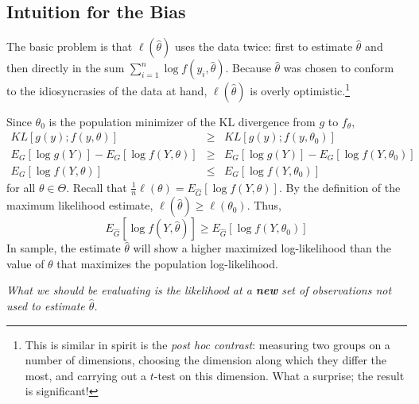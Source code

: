 \documentclass[12pt]{article}
\theoremstyle{definition}
\begin{document}
\subsection{Intuition for the Bias}
The basic problem is that $\ell(\hat{\theta})$ uses the data twice: first to estimate $\hat{\theta}$ and then directly in the sum $\sum_{i=1}^n \log{ f(y_i,\hat{\theta})}$. Because $\hat{\theta}$ was chosen to conform to the idiosyncrasies of the data at hand, $\ell(\hat{\theta})$ is overly optimistic.\footnote{This is similar in spirit is the \emph{post hoc contrast}: measuring two groups on a number of dimensions, choosing the dimension along which they differ the most, and carrying out a $t$-test on this dimension. What a surprise; the result is significant!}

Since $\theta_0$ is the population minimizer of the KL divergence from $g$ to $f_\theta$, 
	\begin{eqnarray*}
		KL\left[ g(y);f(y,\theta) \right] &\geq& KL\left[ g(y);f(y,\theta_0) \right]\\
		E_G\left[  \log{g(Y)}\right] - E_G\left[ \log{f(Y,\theta)} \right] &\geq& E_G\left[  \log{g(Y)}\right] - E_G\left[ \log{f(Y,\theta_0)} \right]\\
	  E_G\left[ \log{f(Y,\theta)} \right] &\leq&  E_G\left[ \log{f(Y,\theta_0)} \right]\
	\end{eqnarray*}
for all $\theta \in \Theta$. Recall that $\frac{1}{n}\ell(\theta) = E_{\hat{G}}\left[ \log{f(Y,\theta)}\right]$. By the definition of the maximum likelihood estimate, $\ell(\hat{\theta})\geq\ell(\theta_0)$. Thus,
		 $$E_{\hat{G}}\left[ \log{f(Y,\hat{\theta})}\right]\geq  E_{\hat{G}}\left[ \log{f\left(Y,\theta_0\right)}\right] $$
In sample, the estimate $\hat{\theta}$ will show a higher maximized log-likelihood than the value of $\theta$ that maximizes the population log-likelihood.

\emph{What we should be evaluating is the likelihood at a \textbf{new} set of observations not used to estimate $\hat{\theta}$.}
\end{document}
